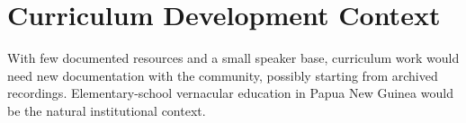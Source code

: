 \documentclass[12pt]{article}
\begin{document}
\section{Curriculum Development Context}
With few documented resources and a small speaker base, curriculum work would need new documentation with the community, possibly starting from archived recordings. Elementary-school vernacular education in Papua New Guinea would be the natural institutional context.
\end{document}
